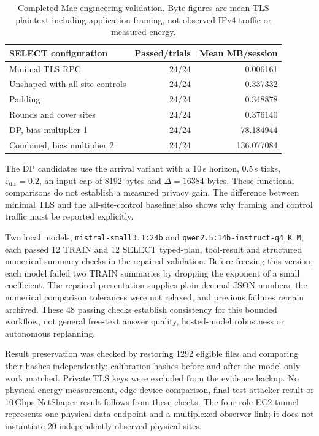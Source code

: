 \begin{table}[t]
\centering
\caption{Completed Mac engineering validation. Byte figures are mean TLS plaintext including application framing, not observed IPv4 traffic or measured energy.}\label{tab:engineering}
\footnotesize
\begin{tabular}{@{}lrr@{}}
\toprule
SELECT configuration & Passed/trials & Mean MB/session \\
\midrule
Minimal TLS RPC & 24/24 & 0.006161 \\
Unshaped with all-site controls & 24/24 & 0.337332 \\
Padding & 24/24 & 0.348878 \\
Rounds and cover sites & 24/24 & 0.376140 \\
DP, bias multiplier 1 & 24/24 & 78.184944 \\
Combined, bias multiplier 2 & 24/24 & 136.077084 \\
\bottomrule
\end{tabular}
\end{table}
The DP candidates use the arrival variant with a 10\,s horizon, 0.5\,s ticks, $\varepsilon_{\mathrm{dir}}=0.2$, an input cap of 8192 bytes and $\Delta=16384$ bytes. These functional comparisons do not establish a measured privacy gain. The difference between minimal TLS and the all-site-control baseline also shows why framing and control traffic must be reported explicitly.

Two local models, \nolinkurl{mistral-small3.1:24b} and \nolinkurl{qwen2.5:14b-instruct-q4_K_M}, each passed 12 TRAIN and 12 SELECT typed-plan, tool-result and structured numerical-summary checks in the repaired validation. Before freezing this version, each model failed two TRAIN summaries by dropping the exponent of a small coefficient. The repaired presentation supplies plain decimal JSON numbers; the numerical comparison tolerances were not relaxed, and previous failures remain archived. These 48 passing checks establish consistency for this bounded workflow, not general free-text answer quality, hosted-model robustness or autonomous replanning.

Result preservation was checked by restoring 1292 eligible files and comparing their hashes independently; calibration hashes before and after the model-only work matched. Private TLS keys were excluded from the evidence backup. No physical energy measurement, edge-device comparison, final-test attacker result or 10\,Gbps NetShaper result follows from these checks. The four-role EC2 tunnel represents one physical data endpoint and a multiplexed observer link; it does not instantiate 20 independently observed physical sites.

